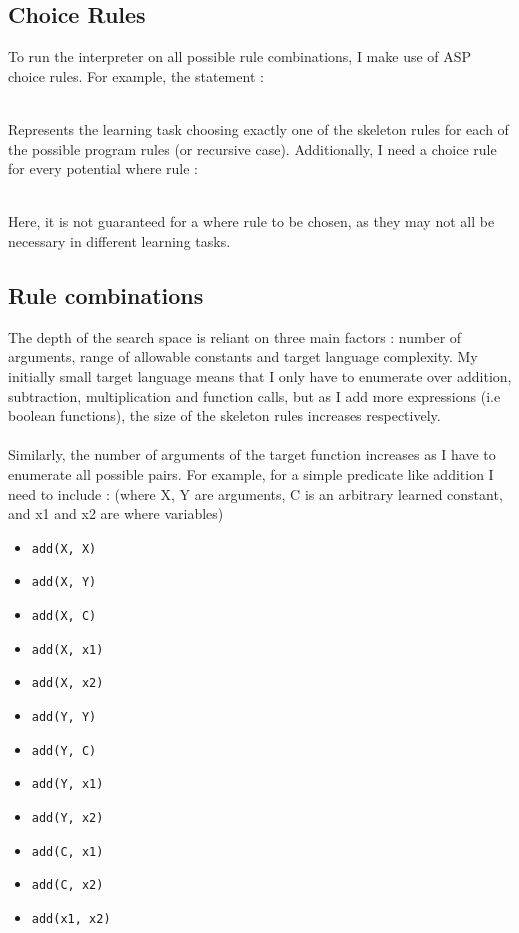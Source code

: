 \subsection{Choice Rules}
To run the interpreter on all possible rule combinations, I make use of ASP choice rules. For example, the statement :


\mbox{} \\
Represents the learning task choosing exactly one of the skeleton rules for each of the possible program rules (or recursive case). Additionally, I need a choice rule for every potential where rule : 


\mbox{} \\
Here, it is not guaranteed for a where rule to be chosen, as they may not all be necessary in different learning tasks. 

\subsection{Rule combinations}
The depth of the search space is reliant on three main factors : number of arguments, range of allowable constants and target language complexity. My initially small target language means that I only have to enumerate over addition, subtraction, multiplication and function calls, but as I add more expressions (i.e boolean functions), the size of the skeleton rules increases respectively. \\ \\
Similarly, the number of arguments of the target function increases as I have to enumerate all possible pairs. For example, for a simple predicate like addition I need to include : (where X, Y are arguments, C is an arbitrary learned constant, and x1 and x2 are where variables) 

\begin{multicols}{2}
\begin{itemize}
\item \lstinline{add(X, X)}
\item \lstinline{add(X, Y)}
\item \lstinline{add(X, C)}
\item \lstinline{add(X, x1)}
\item \lstinline{add(X, x2)}
\item \lstinline{add(Y, Y)}
\item \lstinline{add(Y, C)}
\item \lstinline{add(Y, x1)}
\item \lstinline{add(Y, x2)}
\item \lstinline{add(C, x1)}
\item \lstinline{add(C, x2)}
\item \lstinline{add(x1, x2)}
\end{itemize}
\end{multicols}

